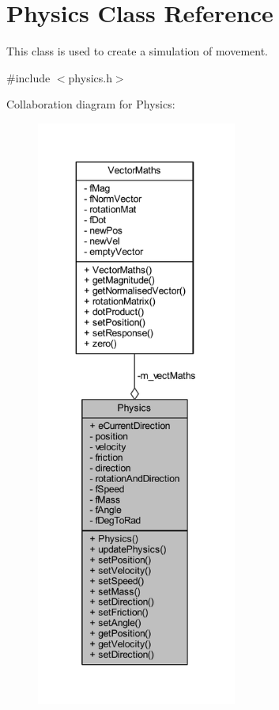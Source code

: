 \hypertarget{class_physics}{}\section{Physics Class Reference}
\label{class_physics}


This class is used to create a simulation of movement.  




{\ttfamily \#include $<$physics.\+h$>$}



Collaboration diagram for Physics\+:\nopagebreak
\begin{figure}[H]
\begin{center}
\leavevmode
\includegraphics[height=550pt]{class_physics__coll__graph}
\end{center}
\end{figure}
